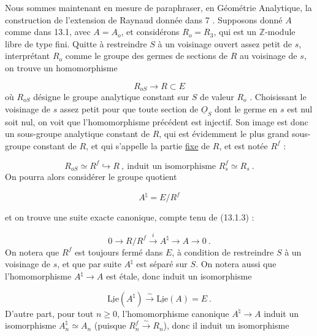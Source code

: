 Nous sommes maintenant en mesure de paraphraser, en Géométrie Analytique, la construction de l'extension de Raynaud donnée dans 7 . Supposons donné $A$ comme dans 13.1, avec $A = A_o$, et considérons $R_o = R_3$, qui est un $\mathbb{Z}$-module libre de type fini. Quitte à restreindre $S$ à un voisinage ouvert assez petit de $s$, interprétant $R_o$ comme le groupe des germes de sections de $R$ au voisinage de $s$, on trouve un homomorphisme

\begin{equation}\tag{13.3.1}
R_{oS} \longrightarrow R \subset E
\end{equation}
où $R_{oS}$ désigne le groupe analytique constant sur $S$ de valeur $R_o$ . Choisissant le voisinage de $s$ assez petit pour que toute section de $\underline{O}_S$ dont le germe en $s$ est nul soit nul, on voit que l'homomorphisme précédent est injectif. Son image est donc un sous-groupe analytique constant de $R$, qui est évidemment le plus grand sous-groupe constant de $R$, et qui s'appelle la partie \underline{fixe} de $R$, et est notée $R^f$ :

\begin{equation}\tag{13.3.2}
R_{oS} \simeq R^f \hookrightarrow R \ , \ \mbox{induit un isomorphisme } R^f_s \simeq R_s \ .
\end{equation}
On pourra alors considérer le groupe quotient

\begin{equation}\tag{13.3.3}
A^\natural = E/R^f
\end{equation}


et on trouve une suite exacte canonique, compte tenu de (13.1.3) :

\begin{equation}\tag{13.3.4}
0 \longrightarrow R/R^f \stackrel{i}{\longrightarrow} A^\natural \longrightarrow A \longrightarrow 0 \ .
\end{equation}
On notera que $R^f$ est toujours fermé dans $E$, à condition de restreindre $S$ à un voisinage de $s$, et que par suite $A^\natural$ est séparé sur $S$. On notera aussi que l'homomorphisme $A^\natural \longrightarrow A$ est étale, donc induit un isomorphisme

\begin{equation}\tag{13.3.5}
\underline{\mathrm{Lie}}(A^\natural) \stackrel{\sim}{\longrightarrow} \underline{\mathrm{Lie}}(A) = E \ .
\end{equation}
D'autre part, pour tout $n \geqslant 0$, l'homomorphisme canonique $A^\natural \longrightarrow A$ induit un isomorphisme $A^\natural_n \simeq A_n$ (puisque $R^f_n \stackrel{\sim}{\longrightarrow} R_n$), donc il induit un isomorphisme

